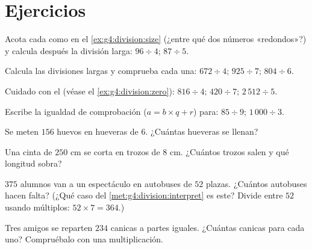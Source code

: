 \section{Ejercicios}

\begin{exercise}[$\star$]\label{exo:g4:division:1}
Acota cada  como en el \cref{ex:g4:division:size} (¿entre qué
dos números «redondos»?) y calcula después la división larga:
$96 \div 4$; \quad $87 \div 5$.
\end{exercise}

\begin{exercise}[$\star$]\label{exo:g4:division:2}
Calcula las divisiones largas y comprueba cada una:
$672 \div 4$; \quad $925 \div 7$; \quad $804 \div 6$.
\end{exercise}

\begin{exercise}[$\star$]\label{exo:g4:division:3}
Cuidado con el  (véase el \cref{ex:g4:division:zero}):
$816 \div 4$; \quad $420 \div 7$; \quad $2\,512 \div 5$.
\end{exercise}

\begin{exercise}[$\star$]\label{exo:g4:division:4}
Escribe la igualdad de comprobación ($a = b \times q + r$) para: $85 \div 9$;
\quad $1\,000 \div 3$.
\end{exercise}

\begin{exercise}[$\star$]\label{exo:g4:division:5}
Se meten $156$ huevos en hueveras de $6$. ¿Cuántas hueveras se llenan?
\end{exercise}

\begin{exercise}[$\star$]\label{exo:g4:division:6}
Una cinta de $250$ cm se corta en trozos de $8$ cm. ¿Cuántos trozos salen
y qué longitud sobra?
\end{exercise}

\begin{exercise}[$\star$]\label{exo:g4:division:7}
$375$ alumnos van a un espectáculo en autobuses de $52$ plazas. ¿Cuántos autobuses
hacen falta? (¿Qué caso del
\cref{met:g4:division:interpret} es este? Divide entre $52$ usando
múltiplos: $52 \times 7 = 364$.)
\end{exercise}

\begin{exercise}[$\star$]\label{exo:g4:division:8}
Tres amigos se reparten $234$ canicas a partes iguales. ¿Cuántas canicas para cada uno?
Compruébalo con una multiplicación.
\end{exercise}

